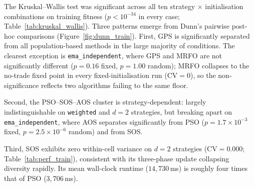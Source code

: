 The Kruskal--Wallis test was significant across all ten strategy $\times$
initialisation combinations on training fitness ($p < 10^{-34}$ in every
case; Table~\ref{tab:kruskal_wallis}). Three patterns emerge from Dunn's
pairwise post-hoc comparisons (Figure~\ref{fig:dunn_train}). First, GPS is
significantly separated from all population-based methods in the large
majority of conditions. The clearest exception is \texttt{ema\_independent},
where GPS and MRFO are not significantly different ($p = 0.16$ fixed,
$p = 1.00$ random); MRFO collapses to the no-trade fixed point in every
fixed-initialisation run ($\textrm{CV} = 0$), so the non-significance
reflects two algorithms failing to the same floor.

Second, the PSO--SOS--AOS cluster is strategy-dependent: largely
indistinguishable on \texttt{weighted} and $d=2$ strategies, but breaking
apart on \texttt{ema\_independent}, where AOS separates significantly from
PSO ($p = 1.7 \times 10^{-3}$ fixed, $p = 2.5 \times 10^{-6}$ random) and
from SOS.

Third, SOS exhibits zero within-cell variance on $d=2$ strategies
($\textrm{CV} = 0.000$; Table~\ref{tab:perf_train}), consistent with its
three-phase update collapsing diversity rapidly. Its mean wall-clock runtime
($14{,}730$\,ms) is roughly four times that of PSO ($3{,}706$\,ms).

